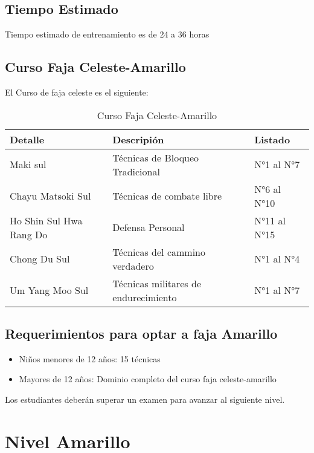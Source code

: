 \subsection[Duración]{Tiempo Estimado}

Tiempo estimado de entrenamiento es de 24 a 36 horas

\subsection{Curso Faja Celeste-Amarillo}
El Curso de faja celeste es el siguiente:

\begin{table}[t]
	\caption{Curso Faja Celeste-Amarillo}
	\begin{center}
		\begin{tabular}{ | m{2cm} | m{5cm} | m{5cm} | }
			\hline Detalle & Descripión & Listado\\ \hline
			Maki sul & Técnicas de Bloqueo Tradicional & N°1 al N°7\\
			Chayu Matsoki Sul & Técnicas de combate libre & N°6 al N°10\\
			Ho Shin Sul Hwa Rang Do\textregistered & Defensa Personal & N°11 al N°15\\
			Chong Du Sul & Técnicas del cammino verdadero & N°1 al N°4\\\hline
			Um Yang Moo Sul & Técnicas militares de endurecimiento & N°1 al N°7\\\hline
		\end{tabular}
	\end{center}
\end{table}

\subsection{Requerimientos para optar a faja Amarillo}

\begin{itemize}
	\item Niños menores de 12 años: 15 técnicas
	\item Mayores de 12 años: Dominio completo del curso faja celeste-amarillo
\end{itemize}

Los estudiantes deberán superar un examen para avanzar al siguiente nivel.

\section{Nivel Amarillo}

